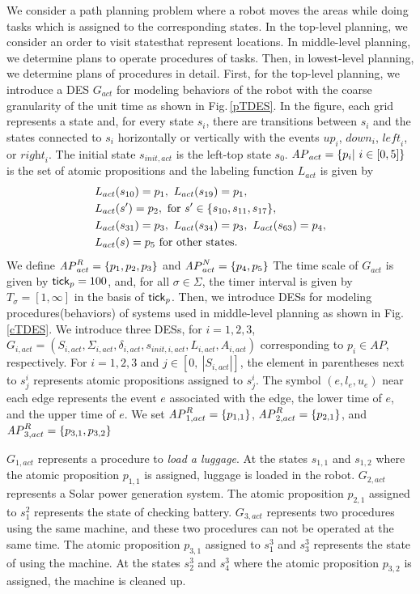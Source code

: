 \documentclass[journal,twoside,web]{IEEEtran}
\newcommand{\rfig}[1]{Fig.\,\ref{#1}}
\newcommand{\tick}{{\sf tick}}
\newcommand{\AP}{{\textit AP}}
\begin{document}
We consider a path planning problem where a robot moves the areas while doing tasks which is assigned to the corresponding states.
In the top-level planning, we consider an order to visit statesthat represent locations.
In middle-level planning, we determine plans to operate procedures of tasks. 
Then, in lowest-level planning, we determine plans of procedures in detail.
%
%
First, for the top-level planning, we introduce a DES $G_{act}$ for modeling behaviors of the robot 
 with the coarse granularity of the unit time as shown in \rfig{pTDES}.
%
In the figure, each grid represents a state and, for every state $s_i$, there are transitions between $s_i$ and the states connected to $s_i$ horizontally or vertically with the events $\textit{up}_i$, $\textit{down}_i$, $\textit{left}_i$, or $\textit{right}_i$.
%
The initial state $s_{init,act}$ is the left-top state $s_0$.
$\AP_{act}=\{p_i|~i\in[0,5]\}$ is the set of atomic propositions and the labeling function $L_{act}$ is given by
\begin{align}
&L_{act}(s_{ 10 }) =  p_1,\
L_{act}(s_{19}) =  p_1, \notag \\
&L_{act}(s') = p_2,\mbox{ for } s'\in\{s_{10},s_{11},s_{17}\}, \notag\\
&L_{act}(s_{ 31 }) = p_3,\ 
L_{act}(s_{ 34 }) =  p_3, \ 
L_{act}(s_{ 63 }) =  p_4,\notag\\
&L_{act}(s) =  p_5\mbox{ for other states.}%
\end{align}
We define $\AP_{act}^R=\{p_1,p_2,p_3\}$ and $\AP_{act}^N=\{p_4,p_5\}$ 
The time scale of $G_{act}$ is given by ${\tick}_p=100$, and, for all $\sigma\in \Sigma$, the timer interval is given by $T_\sigma=[1,\infty]$ in the basis of ${\tick}_p$.
%
%
Then, we introduce DESs for modeling procedures(behaviors) of systems used in middle-level planning as shown in \rfig{cTDES}.
We introduce three DESs, for $i=1,2,3$, $G_{i,act}=(S_{i,act}, \Sigma_{i,act}, \delta_{i,act},s_{init,i,act}, L_{i,act}, A_{i,act})$ corresponding to $p_i\in \textit{AP}$, respectively.
For $i=1,2,3$ and $j\in[0,\ |S_{i,act}|]$, the element in parentheses next to $s_j^i$ represents atomic propositions assigned to $s_j^i$.
%
The symbol $(e,l_e,u_e)$ near each edge represents the event  $e$ associated with the edge, the lower time of $e$, and the upper time of $e$.
We set $\AP_{1,act}^R=\{p_{1,1}\}$, $\AP_{2,act}^R=\{p_{2,1}\}$, and $\AP_{3,act}^R=\{p_{3,1},p_{3,2}\}$
%

%
$G_{1,act}$ represents a procedure to \textit{load a luggage}. At the states $s_{1,1}$ and $s_{1,2}$ where the atomic proposition $p_{1,1}$ is assigned, luggage is   loaded in the robot.
$G_{2,act}$ represents a Solar power generation system. 
The atomic proposition $p_{2,1}$ assigned to $s_1^2$ represents the state of checking battery.
$G_{3,act}$ represents two procedures using the same machine, and these two procedures can not be operated at the same time.
The atomic proposition $p_{3,1}$ assigned to $s_1^3$ and $s_3^3$ represents the state of using the machine.
At the states $s_2^3$ and $s_4^3$ where the atomic proposition $p_{3,2}$ is assigned, the machine is cleaned up.
\end{document}
